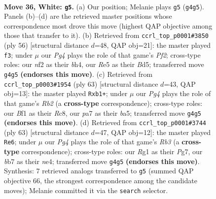 \documentclass[11pt]{article}
\begin{document}
\clearpage

\begin{figure}[p]\centering
\begin{subfigure}{0.46\textwidth}\centering
\resizebox{\linewidth}{!}{%
\newchessgame
\chessboard[
  setfen={1r1r4/pb1p1pk1/8/4R3/6P1/8/PPK2n2/2B2BR1 w - - 4 36},
  showmover=false,
  pgfstyle=straightmove, color=movearrow, markmove={g4-g5}
]}
\caption{}
\end{subfigure}\hfill
\begin{subfigure}{0.46\textwidth}\centering
\resizebox{\linewidth}{!}{%
\newchessgame
\chessboard[
  setfen={2r4r/p4pk1/6p1/B2B4/3PP2b/3K4/P4P2/3R4 w - - 1 29},
  showmover=false,
  pgfstyle=straightmove, color=movearrow, markmove={f2-f3}
]}
\caption{}
\end{subfigure}
\\[4pt]
\begin{subfigure}{0.46\textwidth}\centering
\resizebox{\linewidth}{!}{%
\newchessgame
\chessboard[
  setfen={2r5/1r2bk2/5p2/B2b2p1/8/6P1/5P1N/RR4K1 b - - 3 32},
  showmover=false,
  pgfstyle=straightmove, color=movearrow, markmove={b7-b1}
]}
\caption{}
\end{subfigure}\hfill
\begin{subfigure}{0.46\textwidth}\centering
\resizebox{\linewidth}{!}{%
\newchessgame
\chessboard[
  setfen={3r2k1/4b1pp/1r6/8/P3N3/8/P5PP/1R3R1K b - - 0 32},
  showmover=false,
  pgfstyle=straightmove, color=movearrow, markmove={b6-e6}
]}
\caption{}
\end{subfigure}
\caption{\textbf{Move 36, White: \texttt{g5}.} (a) Our position; Melanie plays \texttt{g5} (\texttt{g4g5}). Panels (b)--(d) are the retrieved master positions whose correspondence most drove this move (highest QAP objective among those that transfer to it). (b) Retrieved from \texttt{ccrl\_top\_p0001\#3850} (ply 56) [structural distance $d$=48, QAP obj=21]: the master played \texttt{f3}; under $\mu$ our \emph{Pg4} plays the role of that game's \emph{Pf2}; cross-type roles: our \emph{n}f2 as their \emph{b}h4, our \emph{R}e5 as their \emph{B}d5; transferred move \texttt{g4g5} \textbf{(endorses this move)}. (c) Retrieved from \texttt{ccrl\_top\_p0003\#1954} (ply 63) [structural distance $d$=43, QAP obj=13]: the master played \texttt{Rxb1+}; under $\mu$ our \emph{Pg4} plays the role of that game's \emph{Rb2} (a \textbf{cross-type} correspondence); cross-type roles: our \emph{B}f1 as their \emph{R}c8, our \emph{p}a7 as their \emph{b}a5; transferred move \texttt{g4g5} \textbf{(endorses this move)}. (d) Retrieved from \texttt{ccrl\_top\_p0001\#3744} (ply 63) [structural distance $d$=47, QAP obj=12]: the master played \texttt{Re6}; under $\mu$ our \emph{Pg4} plays the role of that game's \emph{Rb3} (a \textbf{cross-type} correspondence); cross-type roles: our \emph{R}g1 as their \emph{P}g7, our \emph{b}b7 as their \emph{n}e4; transferred move \texttt{g4g5} \textbf{(endorses this move)}. Synthesis: 7 retrieved analogs transferred to \texttt{g5} (summed QAP objective 66, the strongest correspondence among the candidate moves); Melanie committed it via the \texttt{search} selector.}
\label{fig:thought-m70}
\end{figure}
\end{document}
